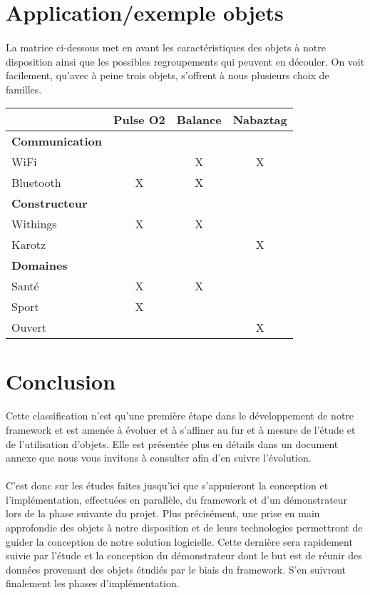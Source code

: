 \documentclass[nocopyrightspace]{sigplanconf}
\begin{document}
\section{Application/exemple objets}
	\paragraph{}
	La matrice ci-dessous met en avant les caractéristiques des objets à notre disposition ainsi que les possibles regroupements qui peuvent en découler. On voit facilement, qu’avec à peine trois objets, s’offrent à nous plusieurs choix de familles.
	
	\begin{tabular}{|l|c|c|c|}
		\hline
			 									& Pulse O2	& Balance	& Nabaztag 	\\
		\hline
				\textbf{Communication} 			& 			& 			&	 		\\
				WiFi				 			& 			& X			& X			\\
				Bluetooth			 			& X			& X			& 			\\
		\hline
				\textbf{Constructeur}		 	& 			& 			& 			\\
				Withings			 			& X			& X			& 			\\
				Karotz				 			& 			& 			& X			\\
		\hline
				\textbf{Domaines}		 		& 			& 			& 			\\
				Santé				 			& X			& X			& 			\\
				Sport				 			& X			& 			& 			\\
				Ouvert				 			& 			& 			& X			\\
		\hline
	\end{tabular}

\section{Conclusion}
	\paragraph{}
	Cette classification n’est qu’une première étape dans le dévelop\-pement de notre framework et est amenée à évoluer et à s’affiner au fur et à mesure de l’étude et de l’utilisation d’objets. Elle est présentée plus en détails dans un document annexe\cite{d2api} que nous vous invitons à consulter afin d’en suivre l’évolution.
	
	\paragraph{}
	C’est donc sur les études faites jusqu’ici que s’appuieront la conception et l’implémentation, effectuées en parallèle, du framework et d’un démonstrateur lors de la phase suivante du projet. Plus précisément, une prise en main approfondie des objets à notre disposition et de leurs technologies permettront de guider la conception de notre solution logicielle. Cette dernière sera rapidement suivie par l’étude et la conception du démonstrateur dont le but est de réunir des données provenant des objets étudiés par le biais du framework. S’en suivront finalement les phases d’implémentation.
\end{document}

